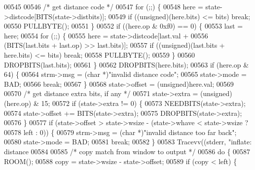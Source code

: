\begin{DoxyCode}
{{{{{{{00545 
00546             \textcolor{comment}{/* get distance code */}
00547             \textcolor{keywordflow}{for} (;;) \{
00548                 here = state->distcode[BITS(state->distbits)];
00549                 \textcolor{keywordflow}{if} ((\textcolor{keywordtype}{unsigned})(here.bits) <= bits) \textcolor{keywordflow}{break};
00550                 PULLBYTE();
00551             \}
00552             \textcolor{keywordflow}{if} ((here.op & 0xf0) == 0) \{
00553                 last = here;
00554                 \textcolor{keywordflow}{for} (;;) \{
00555                     here = state->distcode[last.val +
00556                             (BITS(last.bits + last.op) >> last.bits)];
00557                     \textcolor{keywordflow}{if} ((\textcolor{keywordtype}{unsigned})(last.bits + here.bits) <= bits) \textcolor{keywordflow}{break};
00558                     PULLBYTE();
00559                 \}
00560                 DROPBITS(last.bits);
00561             \}
00562             DROPBITS(here.bits);
00563             \textcolor{keywordflow}{if} (here.op & 64) \{
00564                 strm->msg = (\textcolor{keywordtype}{char} *)\textcolor{stringliteral}{"invalid distance code"};
00565                 state->mode = BAD;
00566                 \textcolor{keywordflow}{break};
00567             \}
00568             state->offset = (unsigned)here.val;
00569 
00570             \textcolor{comment}{/* get distance extra bits, if any */}
00571             state->extra = (\textcolor{keywordtype}{unsigned})(here.op) & 15;
00572             \textcolor{keywordflow}{if} (state->extra != 0) \{
00573                 NEEDBITS(state->extra);
00574                 state->offset += BITS(state->extra);
00575                 DROPBITS(state->extra);
00576             \}
00577             \textcolor{keywordflow}{if} (state->offset > state->wsize - (state->whave < state->wsize ?
00578                                                 left : 0)) \{
00579                 strm->msg = (\textcolor{keywordtype}{char} *)\textcolor{stringliteral}{"invalid distance too far back"};
00580                 state->mode = BAD;
00581                 \textcolor{keywordflow}{break};
00582             \}
00583             Tracevv((stderr, \textcolor{stringliteral}{"inflate:         distance %
00584 
00585             \textcolor{comment}{/* copy match from window to output */}
00586             \textcolor{keywordflow}{do} \{
00587                 ROOM();
00588                 copy = state->wsize - state->offset;
00589                 \textcolor{keywordflow}{if} (copy < left) \{
}}}}}}}}
\end{DoxyCode}
